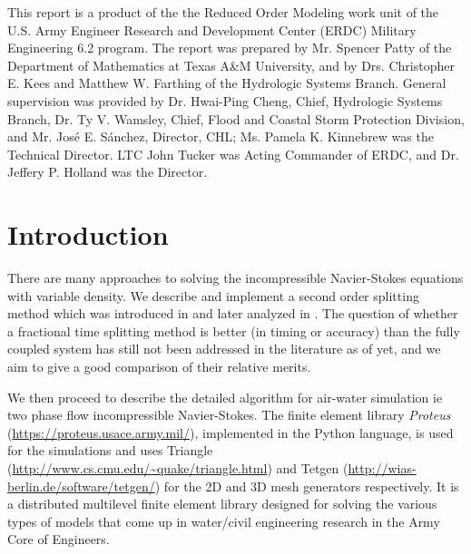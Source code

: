 \documentclass[letterpaper]{erdc}
\begin{document}
This report is a product of the the Reduced Order Modeling work unit of the
U.S. Army Engineer Research and Development Center (ERDC) Military Engineering
6.2 program.  The report was prepared by Mr. Spencer Patty of the Department of
Mathematics at Texas A\&M University, and by Drs. Christopher E. Kees and
Matthew W. Farthing of the Hydrologic Systems Branch.  General supervision was
provided by Dr. Hwai-Ping Cheng, Chief, Hydrologic Systems Branch, Dr. Ty
V. Wamsley, Chief, Flood and Coastal Storm Protection Division, and
Mr. Jos\'{e} E. S\'{a}nchez, Director, CHL; Ms. Pamela K. Kinnebrew was the
Technical Director.  LTC John Tucker was Acting Commander of ERDC, and
Dr. Jeffery P. Holland was the Director.

\mainmatter

\chapter{Introduction}

There are many approaches to solving the incompressible Navier-Stokes equations with variable density.  We describe and implement a second order splitting method which was introduced in \cite{guermond2009splitting} and later analyzed in \cite{guermond2011error}.  The question of whether a fractional time splitting method is better (in timing or accuracy) than the fully coupled system has still not been addressed in the literature as of yet, and we aim to give a good comparison of their relative merits.  

We then proceed to describe the detailed algorithm for air-water simulation ie two phase flow incompressible Navier-Stokes.  The finite element library \textit{Proteus} (\url{https://proteus.usace.army.mil/}), implemented in the Python language, is used for the simulations and uses Triangle (\url{http://www.cs.cmu.edu/~quake/triangle.html}) and Tetgen (\url{http://wias-berlin.de/software/tetgen/}) for the 2D and 3D mesh generators respectively.  It is a distributed multilevel finite element library designed for solving the various types of models that come up in water/civil engineering research in the Army Core of Engineers.


%
%
%
%
\end{document}
